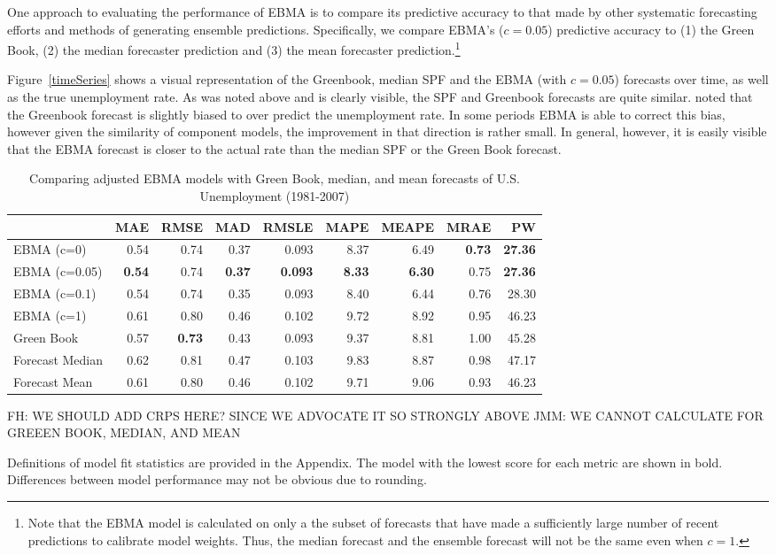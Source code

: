\documentclass[12pt,fullpage,endnotes]{article}
\begin{document}
One approach to evaluating the performance of EBMA is to compare its
predictive accuracy to that made by other systematic forecasting
efforts and methods of generating ensemble predictions.  Specifically,
we compare EBMA's ($c=0.05$) predictive accuracy to (1) the Green
Book, (2) the median forecaster prediction and (3) the mean forecaster
prediction.\footnote{Note that the EBMA model is calculated on only a
  the subset of forecasts that have made a sufficiently large number
  of recent predictions to calibrate model weights.  Thus, the median
  forecast and the ensemble forecast will not be the same even when
  $c=1$.} 

Figure~\ref{timeSeries} shows a visual representation of the
Greenbook, median SPF and the EBMA (with $c=0.05$) forecasts over
time, as well as the true unemployment rate. As was noted above and is
clearly visible, the SPF and Greenbook forecasts are quite
similar. \citet{Baghestani:2008} noted that the Greenbook forecast is
slightly biased to over predict the unemployment rate. In some periods
EBMA is able to correct this bias, however given the similarity of
component models, the improvement in that direction is rather
small. In general, however, it is easily visible that the EBMA
forecast is closer to the actual rate than the median SPF or the Green
Book forecast.

\begin{table}[h]
\caption{Comparing adjusted EBMA models with Green Book, median, and mean forecasts of U.S. Unemployment (1981-2007)}
\begin{center}
\begin{tabular}{lrrrrrrrr}
\toprule
 & MAE & RMSE & MAD & RMSLE & MAPE & MEAPE & MRAE & PW \\ 
\midrule
 EBMA (c=0)& 0.54 & 0.74 & 0.37 & 0.093 & 8.37 & 6.49 & \textbf{0.73} & \textbf{27.36} \\ 
  EBMA (c=0.05)& \textbf{0.54} & 0.74 &\textbf{ 0.37} & \textbf{0.093} & \textbf{8.33} & \textbf{6.30} & 0.75 & \textbf{27.36} \\ 
 EBMA (c=0.1)& 0.54 & 0.74 & 0.35 & 0.093 & 8.40 & 6.44 & 0.76 & 28.30 \\ 
EBMA (c=1) & 0.61 & 0.80 & 0.46 & 0.102 & 9.72 & 8.92 & 0.95 & 46.23 \\ 
 Green Book& 0.57 & \textbf{0.73} & 0.43 & 0.093 & 9.37 & 8.81 & 1.00 & 45.28 \\ 
 Forecast Median& 0.62 & 0.81 & 0.47 & 0.103 & 9.83 & 8.87 & 0.98 & 47.17 \\ 
Forecast Mean& 0.61 & 0.80 & 0.46 & 0.102 & 9.71 & 9.06 & 0.93 & 46.23 \\ 
\bottomrule
\end{tabular}
\end{center}

FH: WE SHOULD ADD CRPS HERE? SINCE WE ADVOCATE IT SO STRONGLY ABOVE
JMM: WE CANNOT CALCULATE FOR GREEEN BOOK, MEDIAN, AND MEAN

\label{compareTable1}
Definitions of model fit statistics are provided in the Appendix. The model with the lowest score for each metric are shown in bold.  Differences between model performance may not be obvious due to rounding.
\end{table}
\end{document}
